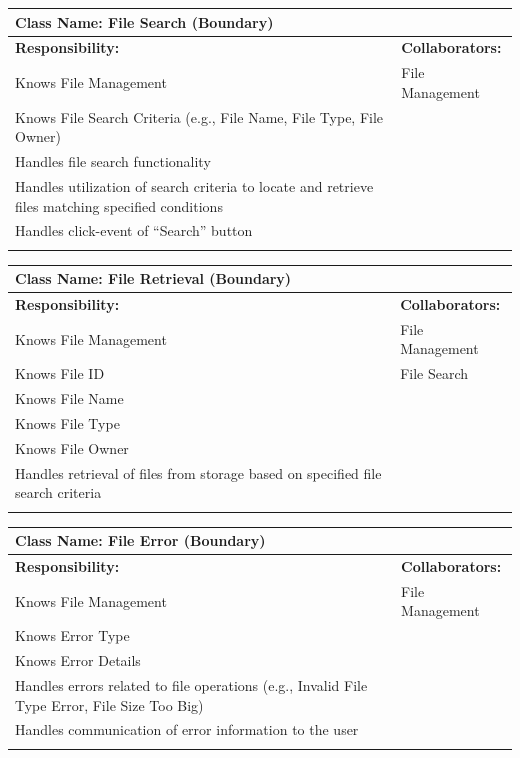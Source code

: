 \documentclass[]{article}
\begin{document}
	\begin{table}[ht]
		\centering
		\begin{tabular}{|p{7cm}|p{7cm}|}
		\hline 
		 \multicolumn{2}{|l|}{\textbf{Class Name:} File Search (Boundary)} \\
		\hline
		\textbf{Responsibility:} & \textbf{Collaborators:} \\
		\hline
			Knows File Management & File Management\\
			Knows File Search Criteria (e.g., File Name, File Type, File Owner) &\\
			Handles file search functionality &\\
			Handles utilization of search criteria to locate and retrieve files matching specified conditions &\\
			Handles click-event of “Search” button &\\
		\vspace{0.1in} & \\
		\hline
		\end{tabular}
	\end{table}

	\begin{table}[ht]
		\centering
		\begin{tabular}{|p{7cm}|p{7cm}|}
		\hline 
		 \multicolumn{2}{|l|}{\textbf{Class Name:} File Retrieval (Boundary)} \\
		\hline
		\textbf{Responsibility:} & \textbf{Collaborators:} \\
		\hline
			Knows File Management & File Management \\
			Knows File ID & File Search \\
			Knows File Name &\\
			Knows File Type &\\
			Knows File Owner &\\
			Handles retrieval of files from storage based on specified file search criteria &\\
		\vspace{0.1in} & \\
		\hline
		\end{tabular}
	\end{table}

	\begin{table}[ht]
		\centering
		\begin{tabular}{|p{7cm}|p{7cm}|}
		\hline 
		 \multicolumn{2}{|l|}{\textbf{Class Name:} File Error (Boundary)} \\
		\hline
		\textbf{Responsibility:} & \textbf{Collaborators:} \\
		\hline
			Knows File Management & File Management \\
			Knows Error Type &\\
			Knows Error Details &\\
			Handles errors related to file operations (e.g., Invalid File Type Error, File Size Too Big) &\\
			Handles communication of error information to the user &\\
		\vspace{0.1in} & \\
		\hline
		\end{tabular}
	\end{table}
\end{document}
